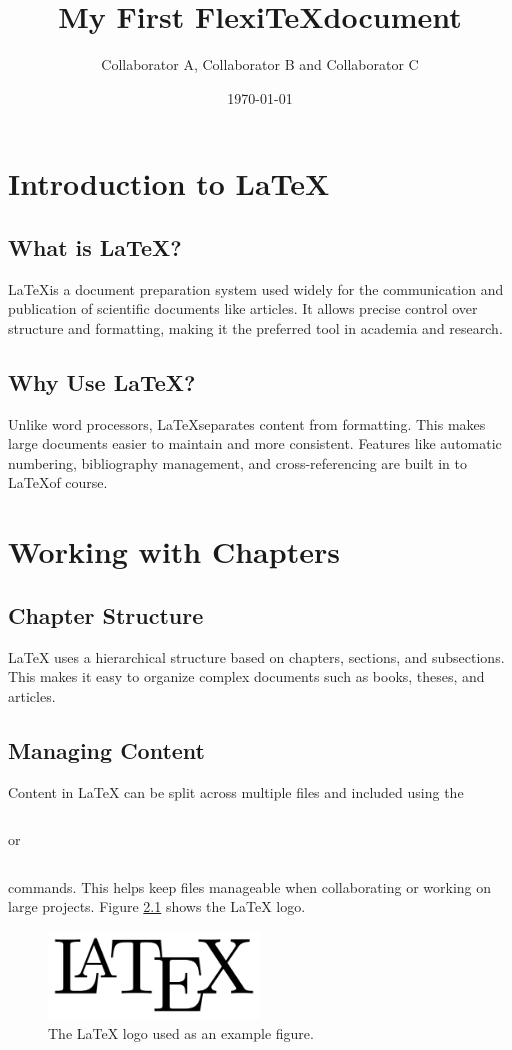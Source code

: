 \documentclass{report}
\title{My First Flexi\TeX document}
\author{Collaborator A, Collaborator B and Collaborator C}
\date{\today}
\begin{document}
\maketitle
\chapter{Introduction to \LaTeX}
\section{What is \LaTeX?}
\LaTeX is a document preparation system used widely for the communication and publication of scientific documents like articles. It allows precise control over structure and formatting, making it the preferred tool in academia and research.
\section{Why Use \LaTeX?}
Unlike word processors,
\LaTeX separates content from formatting. This makes large documents easier to maintain and more consistent. Features like automatic numbering, bibliography management, and cross-referencing are built in to
\LaTeX of course.
\chapter{Working with Chapters}
\section{Chapter Structure}
LaTeX uses a hierarchical structure based on chapters, sections, and subsections. This makes it easy to organize complex documents such as books, theses, and articles.
\section{Managing Content}
Content in LaTeX can be split across multiple files and included using the
\begin{verbatim}

\end{verbatim}
or
\begin{verbatim}

\end{verbatim}
commands. This helps keep files manageable when collaborating or working on large projects. Figure
\ref{fig:latex-logo}
shows the LaTeX logo.
\begin{figure}[h]
\centering
\includegraphics[width=0.5\textwidth]{figs/logo.png}
\caption{The LaTeX logo used as an example figure.}
\label{fig:latex-logo}
\end{figure}
\end{document}
